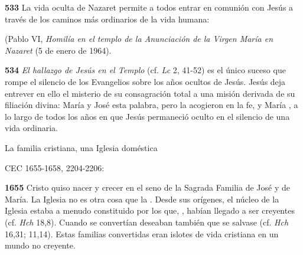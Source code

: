 \begin{body}
\begin{body}
\textbf{533} La vida oculta de Nazaret permite a todos entrar en comunión con Jesús a través de los caminos más ordinarios de la vida humana:

 (Pablo VI, \emph{Homilía en el templo de la Anunciación de la Virgen María en Nazaret} (5 de enero de 1964).

\textbf{534} \emph{El hallazgo de Jesús en el Templo} (cf. \emph{Lc} 2, 41-52) es el único suceso que rompe el silencio de los Evangelios sobre los años ocultos de Jesús. Jesús deja entrever en ello el misterio de su consagración total a una misión derivada de su filiación divina:  María y José  esta palabra, pero la acogieron en la fe, y María , a lo largo de todos los años en que Jesús permaneció oculto en el silencio de una vida ordinaria.

La familia cristiana, una Iglesia doméstica

CEC 1655-1658, 2204-2206:

\textbf{1655} Cristo quiso nacer y crecer en el seno de la Sagrada Familia de José y de María. La Iglesia no es otra cosa que la . Desde sus orígenes, el núcleo de la Iglesia estaba a menudo constituido por los que, , habían llegado a ser creyentes (cf. \emph{Hch} 18,8). Cuando se convertían deseaban también que se salvase  (cf. \emph{Hch} 16,31; 11,14). Estas familias convertidas eran islotes de vida cristiana en un mundo no creyente.


\end{body}
\end{body}
